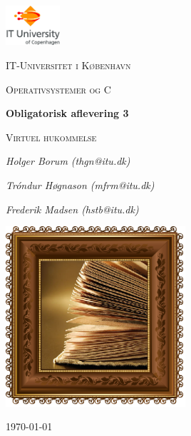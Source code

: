 
\begin{titlepage}
	\centering
	\includegraphics[width=0.15\textwidth]{logo}\par\vspace{1cm}
	{\scshape\LARGE IT-Universitet i København \par}
	\vspace{1cm}
	{\scshape\Large Operativsystemer og C\par}
	{\huge\bfseries Obligatorisk aflevering 3\par}
	\vspace{0.5cm}
	{\scshape\large Virtuel hukommelse\par}
	\vspace{0.5cm}
	{\Large\itshape Holger Borum (thgn@itu.dk)\par}
	{\Large\itshape Tróndur Høgnason (mfrm@itu.dk)\par}
	{\Large\itshape Frederik Madsen (hstb@itu.dk)\par}
	\vspace{1 cm}
	\includegraphics[width=0.5\textwidth]{pages}\par\vspace{1cm}
\vspace{\fill}
	{\large \today\par}
\end{titlepage}